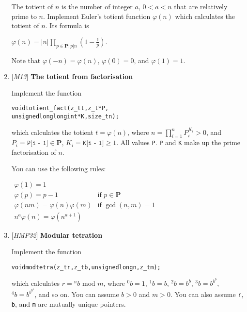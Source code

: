\begin{enumerate}[label=\textbf{\arabic*}.]
The totient of $n$ is the number of integer $a$,
$0 < a < n$ that are relatively prime to $n$.
Implement Euler's totient function $\varphi(n)$
which calculates the totient of $n$. Its
formula is

\( \displaystyle{
    \varphi(n) = |n| \prod_{p \in \textbf{P} : p | n}
    \left ( 1 - \frac{1}{p} \right ).
}\)

Note that $\varphi(-n) = \varphi(n)$, $\varphi(0) = 0$,
and $\varphi(1) = 1$.



\item {[\textit{M13}]} \textbf{The totient from factorisation}

Implement the function

\vspace{-1em}
\begin{alltt}
   void totient_fact(z_t t, z_t *P,
                     unsigned long long int *K, size_t n);
\end{alltt}
\vspace{-1em}

\noindent
which calculates the totient $t = \varphi(n)$, where
$n = \displaystyle{\prod_{i = 1}^n P_i^{K_i}} > 0$,
and $P_i = \texttt{P[i - 1]} \in \textbf{P}$,
$K_i = \texttt{K[i - 1]} \ge 1$. All values \texttt{P}.
\texttt{P} and \texttt{K} make up the prime factorisation
of $n$.

You can use the following rules:

\( \displaystyle{
  \begin{array}{ll}
      \varphi(1) = 1                      & \\
      \varphi(p) = p - 1                  & \text{if } p \in \textbf{P} \\
      \varphi(nm) = \varphi(n)\varphi(m)  & \text{if } \gcd(n, m) = 1   \\
      n^a\varphi(n) = \varphi(n^{a + 1})  &
  \end{array}
}\)



\item {[\textit{HMP32}]} \textbf{Modular tetration}

Implement the function

\vspace{-1em}
\begin{alltt}
   void modtetra(z_t r, z_t b, unsigned long n, z_t m);
\end{alltt}
\vspace{-1em}

\noindent
which calculates $r = {}^n{}b \text{ mod } m$, where
${}^0{}b = 1$, ${}^1{}b = b$, ${}^2{}b = b^b$,
${}^3{}b = b^{b^b}$, ${}^4{}b = b^{b^{b^b}}$, and so on.
You can assume $b > 0$ and $m > 0$. You can also assume
\texttt{r}, \texttt{b}, and \texttt{m} are mutually
unique pointers.




\end{enumerate}
